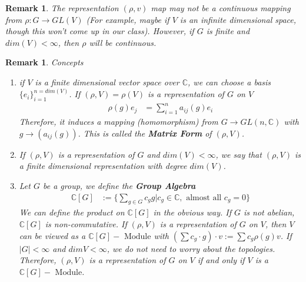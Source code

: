 \documentclass[letterpaper, leqno, 12pt]{article}
\newcommand{\fin}{\qquad \quad \hfill \framebox[1.75mm][l]{\,}}
\newcommand{\bC} {\mathbb{C}}
\theoremstyle{stdthm}
\theoremstyle{stddef}
\newtheorem{rem}[thm]{Remark} %
\theoremstyle{stdnonum}
\theoremstyle{stdqands}
\theoremstyle{stdbold}
\begin{document}
\begin{rem}
The representation $(\rho, v)$ map may not be a continuous mapping from $\rho: G \rightarrow GL(V)$ (For example, maybe if $V$ is an infinite dimensional space, though this won't come up in our class). However, if $G$ is finite and $dim(V)<\infty$, then $\rho$ will be continuous. 
\end{rem}

\begin{rem} Concepts

\begin{enumerate}
\item if $V$ is a finite dimensional vector space over $\bC$, we can choose a basis $\{e_i\}_{i=1}^{n=dim(V)}$. If $(\rho, V)= \rho(V)$ is a representation of $G$ on $V$
\begin{align*}
\rho(g)e_j &= \sum_{i=1}^n a_{ij}(g)e_i
\end{align*}
Therefore, it induces a mapping (homomorphism) from $G\rightarrow GL(n,\bC)$ with $g \rightarrow (a_{ij}(g))$. This is called the {\bf Matrix Form} of $(\rho, V)$.   

\item If $(\rho,V)$ is a representation of $G$ and $dim(V)<\infty$, we say that $(\rho,V)$ is a finite dimensional representation with degree $dim(V)$.

\item Let $G$ be a group, we define the {\bf Group Algebra} 
\begin{align*}
\bC\left[G\right] &:= \{ \sum_{g\in G} c_g g | c_g \in \bC, \text{ almost all } c_g = 0\}
\end{align*} 
We can define the product on $\bC[G]$ in the obvious way. If $G$ is not abelian, $\bC[G]$ is non-commutative.  If $(\rho, V)$ is a representation of $G$ on $V$, then $V$ can be viewed as a $\bC[G] - \text{ Module}$ with $(\sum c_g \cdot g)\cdot v := \sum c_g \rho(g) v$. If $|G|<\infty$ and $dim V < \infty$, we do not need to worry about the topologies. Therefore, $(\rho,V)$ is a representation of $G$ on $V$ if and only if $V$ is a $\bC[G] - \text{ Module}$. 
\end{enumerate}
\end{rem}
\end{document}
